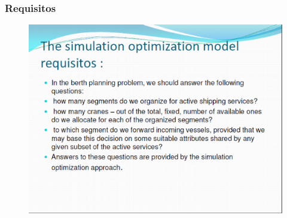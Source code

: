 \documentclass{beamer}
\begin{document}
\begin{frame}
\frametitle{Requisitos }
\begin{figure}[!th]
\begin{center}
\includegraphics[width=1\textwidth]{img/pic7.eps}
\end{center}
\end{figure}
\end{frame}
\end{document}
